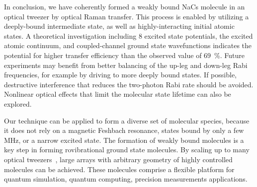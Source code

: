 \documentclass[aps,prl,twocolumn,10pt,superscriptaddress]{revtex4-1}
\begin{document}

In conclusion, we have coherently formed a weakly bound NaCs molecule in an optical tweezer
by optical Raman transfer.  This process is enabled by utilizing a deeply-bound intermediate state, as well as highly-interacting initial atomic states.  A theoretical investigation including 8 excited state potentials,
the excited atomic continuum, and coupled-channel ground state wavefunctions indicates
the potential for higher transfer efficiency than the observed value of $69$~\%.  Future experiments may benefit from better balancing of the up-leg and down-leg Rabi frequencies, for example by driving to more deeply bound states.  If possible, destructive interference that reduces the two-photon Rabi rate should be avoided.  Nonlinear optical effects that limit the molecular state lifetime can also be explored.

Our technique can be applied to form a diverse set of molecular species,
because it does not rely on a magnetic Feshbach resonance, states bound by only a few MHz,
or a narrow excited state. The formation of weakly bound molecules is a key step
in forming rovibrational ground state molecules. By scaling up to many optical tweezers~\cite{Endres2016, Barredo2018,  PhysRevLett.122.203601}, large arrays with arbitrary geometry of highly controlled molecules can be achieved. These molecules comprise a flexible platform for quantum simulation,  quantum computing, precision measurements applications. %
\end{document}
